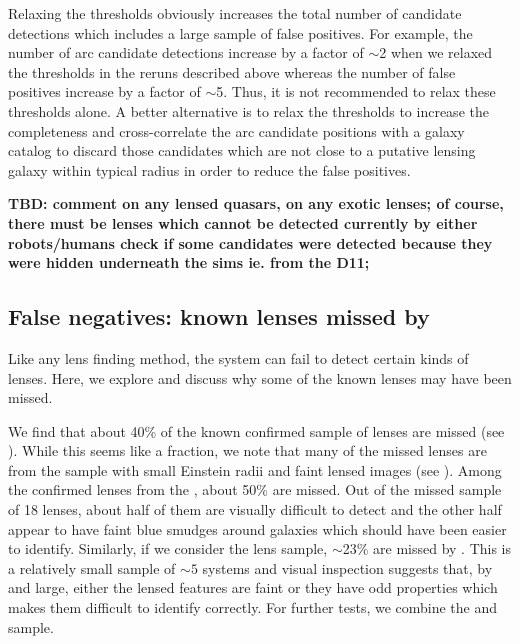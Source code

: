 \documentclass[useAMS,usenatbib,a4paper]{mn2e}
\begin{document}
Relaxing the thresholds obviously increases the total number of
candidate detections which includes a large sample of false positives.
For example, the number of arc candidate detections increase by a factor
of $\sim$2 when we relaxed the thresholds in the reruns described above
whereas the number of false positives increase by a factor of $\sim$5.
Thus, it is not recommended to relax these thresholds alone. A better
alternative is to relax the thresholds to increase the completeness and
cross-correlate the arc candidate positions with a galaxy catalog to
discard those candidates which are not close to a putative lensing
galaxy within typical radius in order to reduce the false positives.


{\bf TBD: 
comment on any lensed quasars, on any exotic lenses;
of course, there must be lenses which cannot be detected currently by
either robots/humans
check if some candidates were detected because they were hidden
underneath the sims ie. from the D11;
}


\subsection{False negatives: known lenses missed by \sw}
\label{sec:fn}
Like any lens finding method, the \sw system can fail to detect certain
kinds of lenses. Here, we explore and discuss why some of the known
lenses may have been missed. 

We find that about 40\% of the known confirmed sample of lenses are
missed (see ). While this seems like a fraction, we note
that many of the missed lenses are from the \rf sample with small
Einstein radii and faint lensed images (see ). Among
the confirmed lenses from the \rf, about 50\% are missed. Out of the
missed sample of 18 lenses, about half of them are visually difficult to
detect and the other half appear to have faint blue smudges around
galaxies which should have been easier to identify. Similarly,
if we consider the \af lens sample, $\sim$23\% are missed by \sw. This
is a relatively small sample of $\sim 5$ systems and visual inspection
suggests that, by and large, either the lensed features are faint
or they have odd properties which makes them difficult to identify
correctly. For further tests, we combine the \rf and \af sample.
\end{document}
